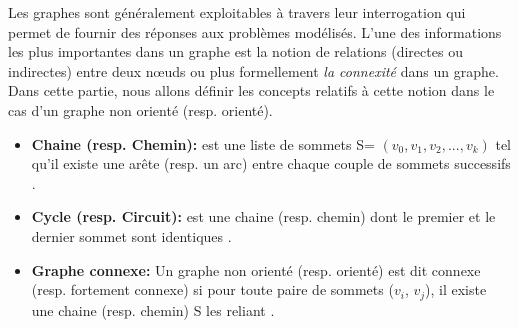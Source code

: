  
 
Les graphes sont généralement exploitables à travers leur interrogation qui permet de fournir des réponses aux problèmes modélisés. L'une des informations les plus importantes dans un graphe est la notion de relations (directes ou indirectes) entre deux nœuds ou plus formellement \textit{la connexité} dans un graphe. Dans cette partie, nous allons définir les concepts relatifs à cette notion dans le cas d'un graphe non orienté (resp. orienté).
 \begin{itemize} [label = $\bullet$]
			 \item \textbf{Chaine (resp. Chemin):}
			est une liste de sommets S= $(v_{0},v_{1},v_{2},...,v_{k})$ tel qu'il existe une arête (resp. un arc) entre chaque couple de sommets successifs \citep{muller}.
			 
			 
			  \item \textbf{Cycle (resp. Circuit):} 
			 est une chaine (resp. chemin) dont le premier et le dernier sommet sont identiques \citep{DUT}.
			 
			 \item \textbf{Graphe connexe:}
			Un graphe non orienté (resp. orienté) est dit connexe (resp. fortement connexe) si pour toute paire de sommets ($v_{i}$, $v_{j}$), il existe une chaine (resp. chemin) S les reliant \citep{muller}.
		
		\end{itemize}